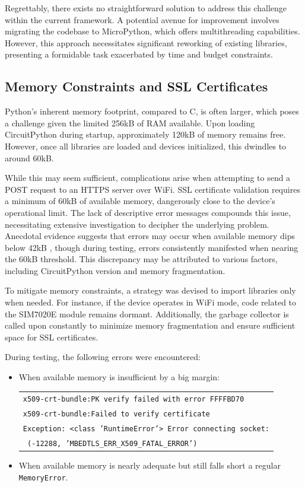 Regrettably, there exists no straightforward solution to address this challenge within the current 
framework. A potential avenue for improvement involves migrating the codebase to MicroPython, which 
offers multithreading capabilities. However, this approach necessitates significant reworking of 
existing libraries, presenting a formidable task exacerbated by time and budget constraints.

\subsection{Memory Constraints and SSL Certificates}

Python's inherent memory footprint, compared to C, is often larger, which poses a challenge given 
the limited 256kB of RAM available. Upon loading CircuitPython during startup, approximately 120kB 
of memory remains free. However, once all libraries are loaded and devices initialized, this 
dwindles to around 60kB.

While this may seem sufficient, complications arise when attempting to send a POST request to an 
HTTPS server over WiFi. SSL certificate validation requires a minimum of 60kB of available memory, 
dangerously close to the device's operational limit. The lack of descriptive error messages 
compounds this issue, necessitating extensive investigation to decipher the underlying problem. 
Anecdotal evidence suggests that errors may occur when available memory dips below 42kB 
\cite{ssl_memoryerror}, though during testing, errors consistently manifested when nearing the 60kB 
threshold. This discrepancy may be attributed to various factors, including CircuitPython version 
and memory fragmentation.

To mitigate memory constraints, a strategy was devised to import libraries only when needed. For 
instance, if the device operates in WiFi mode, code related to the SIM7020E module remains dormant. 
Additionally, the garbage collector is called upon constantly to minimize memory fragmentation and 
ensure sufficient space for SSL certificates.

During testing, the following errors were encountered:

\begin{itemize}
	\item When available memory is insufficient by a big margin:
	
	\begin{tabular}{l}
		\texttt{x509-crt-bundle:PK verify failed with error FFFFBD70} \\
		\texttt{x509-crt-bundle:Failed to verify certificate} \\
		\texttt{Exception: <class 'RuntimeError'> Error connecting socket:} \\
		\texttt{ (-12288, 'MBEDTLS\_ERR\_X509\_FATAL\_ERROR')}
	\end{tabular}

	\item When available memory is nearly adequate but still falls short a regular 
	\texttt{MemoryError}.
\end{itemize}


